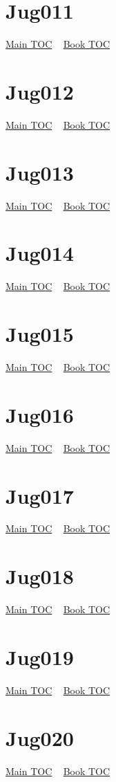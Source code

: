 \documentclass{book}
\begin{document}
  \section{Jug011}\hyperlink{toc}{Main TOC} ~ \hyperref[subsec:Jug]{Book TOC} 
  \section{Jug012}\hyperlink{toc}{Main TOC} ~ \hyperref[subsec:Jug]{Book TOC} 
  \section{Jug013}\hyperlink{toc}{Main TOC} ~ \hyperref[subsec:Jug]{Book TOC} 
  \section{Jug014}\hyperlink{toc}{Main TOC} ~ \hyperref[subsec:Jug]{Book TOC} 
  \section{Jug015}\hyperlink{toc}{Main TOC} ~ \hyperref[subsec:Jug]{Book TOC} 
  \section{Jug016}\hyperlink{toc}{Main TOC} ~ \hyperref[subsec:Jug]{Book TOC} 
  \section{Jug017}\hyperlink{toc}{Main TOC} ~ \hyperref[subsec:Jug]{Book TOC} 
  \section{Jug018}\hyperlink{toc}{Main TOC} ~ \hyperref[subsec:Jug]{Book TOC} 
  \section{Jug019}\hyperlink{toc}{Main TOC} ~ \hyperref[subsec:Jug]{Book TOC} 
  \section{Jug020}\hyperlink{toc}{Main TOC} ~ \hyperref[subsec:Jug]{Book TOC} 
\end{document}
